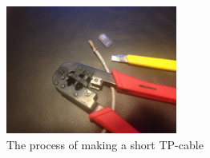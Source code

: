 \begin{figure}[h]
    \centering
    \includegraphics[width=0.5\textwidth]{thebuild/tp_cable.jpg}
    \caption{The process of making a short TP-cable}
    \label{fig:build_tp_cable}
\end{figure}


